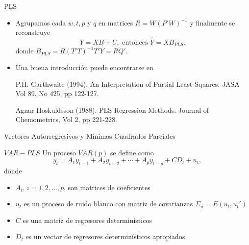 \documentclass{beamer}
\newcommand{\?}{?`}
\begin{document}
\begin{frame}{PLS}
  \begin{itemize}
  \item Agrupamos cada $w,t,p$ y $q$ en matrices $R=W(P'W)^{-1}$ y
    finalmente se reconstruye
    \begin{displaymath}
      Y=XB+U, \text{ entonces } \hat{Y}=XB_{PLS},
    \end{displaymath}
    donde $B_{PLS}=R(T'T)^{-1}T'Y=RQ'$.
  \item Una buena introducci\'on puede encontrarse en 
    \bigskip

    P.H. Garthwaite
    (1994). An Interpretation of Partial Least Squares. JASA Vol 89,
    No 425, pp 122-127.
    \bigskip

    Agnar Hoskuldsson (1988). PLS Regression Methods. Journal of
    Chemometrics, Vol 2, pp 221-228.
  \end{itemize}
\end{frame}

\begin{frame}{}
  \begin{block}{}
    \begin{center}
      \vspace{3mm}
      {\Large Vectores Autorregresivos y M\'inimos Cuadrados Parciales}
      \vspace{3mm}
    \end{center}
  \end{block}
\end{frame}

\begin{frame}{$VAR-PLS$}
  Un proceso $VAR(p)$ se define como
    \begin{displaymath}
      y_t=A_1y_{t-1} + A_2y_{t-2} + \cdots + A_py_{t-p} + CD_t + u_t,
    \end{displaymath}
    donde
    \begin{itemize}
    \item $A_i$, $i=1,2,\ldots, p$, son matrices de coeficientes
    \item $u_t$ es un proceso de ruido blanco con matriz de
      covarianzas $\Sigma_u=E(u_t,u_t')$
    \item $C$ es una matriz de regresores deterministicos
    \item $D_t$ es un vector de regresores determin\'isticos apropiados
    \end{itemize}
\end{frame}
\end{document}
